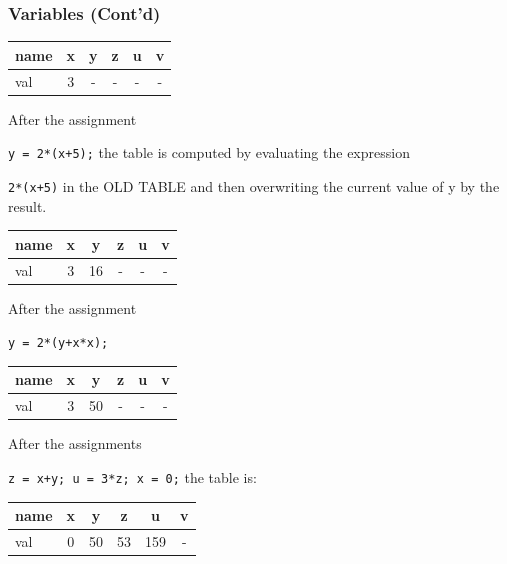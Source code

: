 \documentclass{beamer}
\def\textttb#1{\mcolor{blue}{\texttt{#1}}}
\def\mpause{\pause}
\def\mcolor#1#2{\rule{0ex}{0ex}\color{#1}#2\color{black}{}}
\begin{document}
\begin{frame}
\frametitle{Variables (Cont'd)}
\vspace*{-2ex}\mcolor{red}{\begin{center}
\begin{tabular}{|l||c|c|c|c|c|}\hline
	  name &  x  &  y  &  z  &  u  &  v \\\hline
	  val  &  3  &  -  &  -  &  -  &  - \\\hline
\end{tabular}
\end{center}}

After the assignment \textttb{y = 2*(x+5);} the table is computed by
evaluating the expression \textttb{2*(x+5)} in the OLD TABLE and then
overwriting the current value of y by the result.\mpause
\vspace*{-1ex}\mcolor{red}{\begin{center}
\begin{tabular}{|l||c|c|c|c|c|}\hline
	  name &  x  &  y  &  z  &  u  &  v \\\hline
	  val  &  3  &  16  &  -  &  -  &  - \\\hline
\end{tabular}
\end{center}}\mpause

After the assignment \textttb{y = 2*(y+x*x);}\mpause
\vspace*{-1ex}\mcolor{red}{\begin{center}
\begin{tabular}{|l||c|c|c|c|c|}\hline
	  name &  x  &  y  &  z  &  u  &  v \\\hline
	  val  &  3  &  50  &  -  &  -  &  - \\\hline
\end{tabular}
\end{center}}\mpause

After the assignments \textttb{z = x+y; u = 3*z; x = 0;}
the table is:\mpause
\vspace*{-1ex}\mcolor{red}{\begin{center}
\begin{tabular}{|l||c|c|c|c|c|}\hline
	  name &  x  &  y  &  z  &  u  &  v \\\hline
	  val  &  0  &  50  &  53  &  159  &  - \\\hline
\end{tabular}
\end{center}}
\end{frame}
\end{document}
